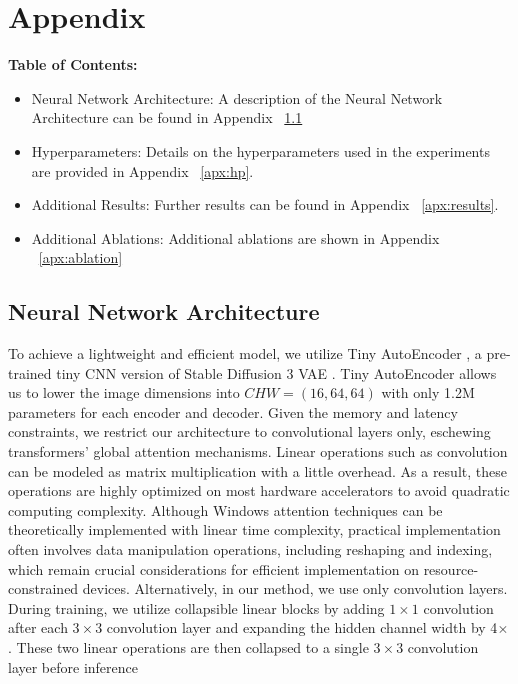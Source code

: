 \section{Appendix}\label{appendix}
\textbf{Table of Contents:}
\begin{itemize}
    \item Neural Network Architecture: A description of the Neural Network Architecture can be found in Appendix ~\ref{apx:nn}
    \item Hyperparameters: Details on the hyperparameters used in the experiments are provided in Appendix ~\ref{apx:hp}.
    \item Additional Results: Further results can be found in Appendix ~\ref{apx:results}.
    \item Additional Ablations: Additional ablations are shown in Appendix ~\ref{apx:ablation}
\end{itemize}

\newpage
\subsection{Neural Network Architecture}\label{apx:nn}
To achieve a lightweight and efficient model, we utilize Tiny AutoEncoder \cite{von-platen-etal-2022-diffusers}, a pre-trained tiny CNN version of Stable Diffusion 3 VAE \cite{esser2024scaling}. Tiny AutoEncoder allows us to lower the image dimensions into $CHW=(16,64,64)$ with only 1.2M parameters for each encoder and decoder. Given the memory and latency constraints, we restrict our architecture to convolutional layers only, eschewing transformers' global attention mechanisms. Linear operations such as convolution can be modeled as matrix multiplication with a little overhead. As a result, these operations are highly optimized on most hardware accelerators to avoid quadratic computing complexity. Although Windows attention techniques \cite{liang2021swinir,crowson2024scalable} can be theoretically implemented with linear time complexity, practical implementation often involves data manipulation operations, including reshaping and indexing, which remain crucial considerations for efficient implementation on resource-constrained devices. Alternatively, in our method, we use only convolution layers. During training, we utilize collapsible linear blocks \cite{bhardwaj2022collapsible} by adding $1\times1$ convolution after each $3\times3$ convolution layer and expanding the hidden channel width by 4$\times$. These two linear operations are then collapsed to a single $3\times3$ convolution layer before inference

